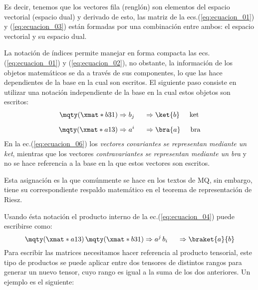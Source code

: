 Es decir, tenemos que los vectores fila (renglón) son elementos del espacio vectorial (espacio dual) y derivado de esto, las matriz de la ecs.(\ref{eq:ecuacion_01}) y (\ref{eq:ecuacion_03}) están formadas por una combinación entre ambos: el espacio vectorial y su espacio dual.
\par
La notación de índices permite manejar en forma compacta las ecs. (\ref{eq:ecuacion_01}) y (\ref{eq:ecuacion_02}), no obstante, la información de los objetos matemáticos se da a través de sus componentes, lo que las hace dependientes de la base en la cual son escritos. El siguiente paso consiste en utilizar una notación independiente de la base en la cual estos objetos son escritos:
\begin{align}
\begin{aligned}
\mqty(\xmat*{b}{3}{1})
&\Rightarrow b_{j} \hspace{0.5cm} \Rightarrow \ket{b} \hspace{0.5cm} \mbox{ket}
\\[0.5em]
\mqty(\xmat*{a}{1}{3})
&\Rightarrow a^{i} \hspace{0.5cm} \Rightarrow \bra{a} \hspace{0.5cm} \mbox{bra}
\end{aligned}
\label{eq:ecuacion_06}
\end{align}
En la ec.(\ref{eq:ecuacion_06}) los \emph{vectores covariantes se representan mediante un ket}, mientras que los vectores \emph{contravariantes se representan mediante un bra} y no se hace referencia a la base en la que estos vectores son escritos.
\par
Esta asignación es la que comúnmente se hace en los textos de MQ, sin embargo, tiene su correspondiente respaldo matemático en el teorema de representación de Riesz.
\par
Usando ésta notación el producto interno de la ec.(\ref{eq:ecuacion_04}) puede escribirse como:
\begin{equation}
\mqty(\xmat*{a}{1}{3}) \, \mqty(\xmat*{b}{3}{1})
\Rightarrow a^{j} \, b_{i} \hspace{0.5cm} \Rightarrow \braket{a}{b}
\label{eq:ecuacion_07}
\end{equation}
Para escribir las matrices necesitamos hacer referencia al producto tensorial, este tipo de productos se puede aplicar entre dos tensores de distintos rangos para generar un nuevo tensor, cuyo rango es igual a la suma de los dos anteriores. Un ejemplo es el siguiente:
